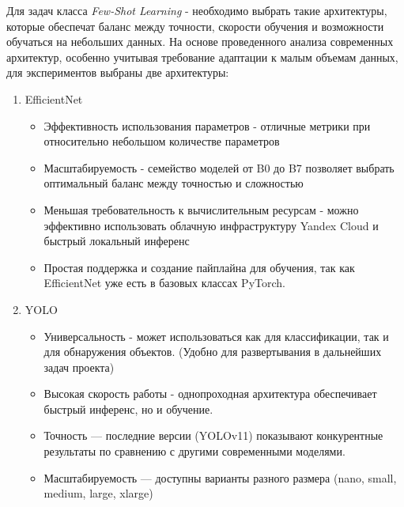 \documentclass[14pt]{extarticle}
\begin{document}
\hspace{1cm}
Для задач класса \textit{Few-Shot Learning} - необходимо выбрать такие архитектуры, которые обеспечат баланс между точности, скорости обучения и возможности обучаться на небольших данных. На основе проведенного анализа современных архитектур, особенно учитывая требование адаптации к малым объемам данных, для экспериментов выбраны две архитектуры:
\begin{enumerate}
\item EfficientNet

\begin{itemize}[leftmargin=-0.5cm]
    \item Эффективность использования параметров - отличные метрики при относительно небольшом количестве параметров
    \item Масштабируемость - семейство моделей от B0 до B7 позволяет выбрать оптимальный баланс между точностью и сложностью
    \item Меньшая требовательность к вычислительным ресурсам - можно эффективно использовать облачную инфраструктуру Yandex Cloud и быстрый локальный инференс
    \item Простая поддержка и создание пайплайна для обучения, так как EfficientNet уже есть в базовых классах PyTorch.
\end{itemize}
\item YOLO
\begin{itemize}[leftmargin=-0.5cm]
    \item Универсальность - может использоваться как для классификации, так и для обнаружения объектов. (Удобно для развертывания в дальнейших задач проекта)
    \item Высокая скорость работы - однопроходная архитектура обеспечивает быстрый инференс, но и обучение. 
    \item Точность --- последние версии (YOLOv11) показывают конкурентные результаты по сравнению с другими современными моделями.
    \item Масштабируемость --- доступны варианты разного размера (nano, small, medium, large, xlarge)
\end{itemize}
\end{enumerate}
\vspace{-10pt}
\end{document}
